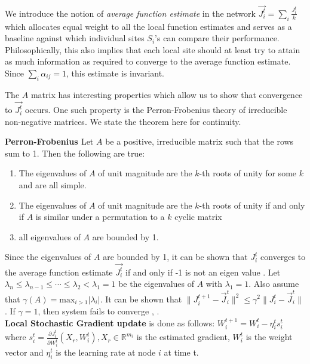 We introduce the notion of \emph{average function estimate} in the network $\vec{J_i^t} = \sum_i \frac{J_i^t}{k}$ which allocates equal weight to all the local function estimates and serves as a baseline against which individual sites $S_i$'s can compare their performance. Philosophically, this also implies that each local site should at least try to attain as much information as required to converge to the average function estimate. Since $\sum_i{\alpha_{ij}}=1$, this estimate is invariant. 

The $A$ matrix has interesting properties which allow us to show that convergence to $\vec{J_i^t}$ occurs. One such property is the Perron-Frobenius theory of irreducible non-negative matrices. We state the theorem here for continuity.

\begin{thm} \textbf{Perron-Frobenius \cite{Varga_62}}
Let $A$ be a positive, irreducible matrix such that the rows sum to 1. Then the following are true:
\begin{enumerate}
\item The eigenvalues of $A$ of unit magnitude are the $k$-th roots of unity for some $k$ and are all simple.
\item The eigenvalues of $A$ of unit magnitude are the $k$-th roots of unity if and only if $A$ is similar under a permutation to a $k$ cyclic matrix
\item all eigenvalues of $A$ are bounded by 1.
\end{enumerate}
\end{thm}

Since the eigenvalues of $A$ are bounded by 1, it can be shown that $J_i^t$ converges to the average function estimate $\vec{J_i^t}$ if and only if -1 is not an eigen value \cite{Varga_62}. 
Let $\lambda_n \le \lambda_{n-1} \le \cdots \le \lambda_2 < \lambda_1 =1$ be the eigenvalues of $A$ with $\lambda_1 = 1$. Also assume that $\gamma (A) = \text{max}_{i>1} |\lambda_i|$. It can be shown that $\parallel J_i^{t+1} - \vec{J}_i^{t} \parallel^2 \le \gamma^2 \parallel J_i^{t} - \vec{J}_i^{t} \parallel$. If $\gamma=1$, then system fails to converge \cite{Varga_62}, \cite{Cybenko_89}. \\
 
 
\noindent \textbf{Local Stochastic Gradient update} is done as follows: $W_i^{t+1} = W_i^t - \eta_i^t s_i^t$ where $s_i^t=\frac{\partial J_i^t}{\partial W_i^t} (X_r, W_i^t), X_r \in \mathbb{R}^{m_i}$ is the estimated gradient, $W_i^t$ is the weight vector and $\eta_i^t$ is the learning rate at node $i$ at time t. 




